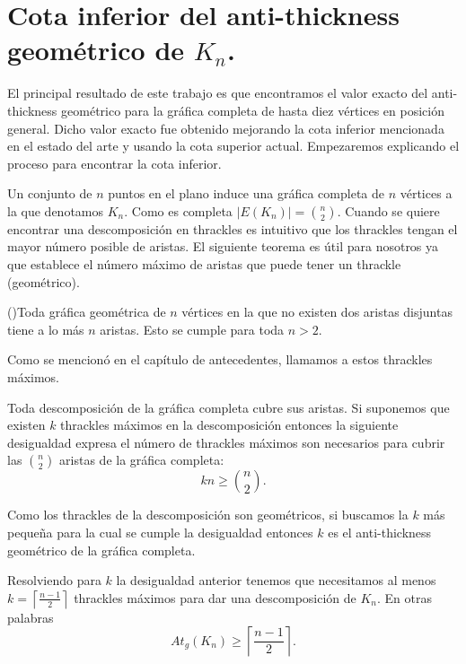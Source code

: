 \section{Cota inferior del anti-thickness geométrico de $K_n$.}
El principal resultado de este trabajo es que encontramos el valor exacto del
anti-thickness geométrico para la gráfica completa de hasta diez vértices en posición general.
Dicho valor exacto fue obtenido mejorando la cota inferior mencionada en el estado del arte
y usando la cota superior actual. Empezaremos explicando el proceso para encontrar la cota inferior.

Un conjunto de $n$ puntos en el plano induce una gráfica completa de $n$ vértices
a la que denotamos $K_n$. Como es completa $|E(K_n)|= \binom{n}{2}$. Cuando se quiere
encontrar una descomposición en thrackles es intuitivo que los thrackles tengan el
mayor número posible de aristas. El siguiente teorema es útil para nosotros ya que
establece el número máximo de aristas que puede tener un thrackle (geométrico).
\begin{theorem}(\cite{Pach2013b})Toda gráfica geométrica de $n$ vértices en la
  que no existen dos aristas disjuntas tiene a lo más $n$ aristas. Esto se cumple
  para toda $n>2$.
\end{theorem}
Como se mencionó en el capítulo de antecedentes, llamamos a estos thrackles máximos.

Toda descomposición de la gráfica completa cubre sus aristas. Si suponemos que existen $k$
thrackles máximos en la descomposición entonces la siguiente desigualdad expresa el número de
thrackles máximos son necesarios para cubrir las $\binom{n}{2}$ aristas de la gráfica completa:
\[ kn \geq \binom{n}{2}. \]

Como los thrackles de la descomposición son geométricos, si buscamos la $k$ más pequeña
para la cual se cumple la desigualdad entonces $k$ es el anti-thickness geométrico de la gráfica completa.

Resolviendo para $k$ la desigualdad anterior tenemos que necesitamos al menos
$k=\left\lceil\frac{n-1}{2}\right\rceil$ thrackles máximos para dar una descomposición
de $K_n$. En otras palabras \[At_g(K_n) \geq  \left\lceil\frac{n-1}{2}\right\rceil.\]

